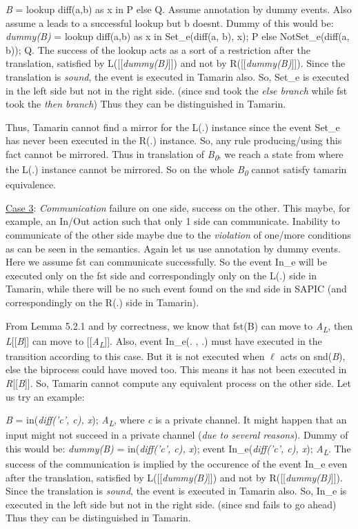 \documentclass[11pt]{article}
\begin{document}
{\it B} = lookup diff(a,b) as x in P else Q. Assume annotation by dummy events. Also assume a leads to a successful lookup but b doesnt. Dummy of this would be: {\it dummy(B)} = lookup diff(a,b) as x in Set\_e(diff(a, b), x); P else NotSet\_e(diff(a, b)); Q. The success of the lookup acts as a sort of a restriction after the translation, satisfied by L([[{\it dummy(B)}]]) and not by R([[{\it dummy(B)}]]). Since the translation is {\it sound}, the event is executed in Tamarin also. So, Set\_e is executed in the left side but not in the right side. (since snd took the {\it else branch} while fst took the {\it then branch}) Thus they can be distinguished in Tamarin. 

Thus, Tamarin cannot find a mirror for the L(.) instance since the event Set\_e has never been executed in the R(.) instance. So, any rule producing/using this fact cannot be mirrored. Thus in translation of {\it B\textsubscript{0}}, we reach a state from where the L(.) instance cannot be mirrored. So on the whole {\it B\textsubscript{0}} cannot satisfy tamarin equivalence.\newline

\underline{Case 3}: {\it Communication} failure on one side, success on the other. This maybe, for example, an In/Out action such that only 1 side can communicate. Inability to communicate of the other side maybe due to the {\it violation} of one/more conditions as can be seen in the semantics. Again let us use annotation by dummy events. Here we assume fst can communicate successfully. So the event In\_e will be executed only on the fst side and correspondingly only on the L(.) side in Tamarin, while there will be no such event found on the snd side in SAPIC (and correspondingly on the R(.) side in Tamarin).

From Lemma 5.2.1 and by correctness, we know that fst(B) can move to {\it A\textsubscript{L}}, then {\it L}[[{\it B}]] can move to [[{\it A\textsubscript{L}}]]. Also, event In\_e(. , .) must have executed in the transition according to this case. But it is not executed when $\ell$ acts on snd({\it B}), else the biprocess could have moved too. This means it has not been executed in {\it R}[[{\it B}]]. So, Tamarin cannot compute any equivalent process on the other side. Let us try an example:

{\it B} = in({\it diff('c', c), x}); {\it A\textsubscript{L}}, where {\it c} is a private channel. It might happen that an input might not succeed in a private channel ({\it due to several reasons}). Dummy of this would be: {\it dummy(B)} = in({\it diff('c', c), x}); event In\_e({\it diff('c', c), x}); {\it A\textsubscript{L}}. The success of the communication is implied by the occurence of the event In\_e even after the translation, satisfied by L([[{\it dummy(B)}]]) and not by R([[{\it dummy(B)}]]). Since the translation is {\it sound}, the event is executed in Tamarin also. So, In\_e is executed in the left side but not in the right side. (since snd fails to go ahead) Thus they can be distinguished in Tamarin. 
\end{document}
